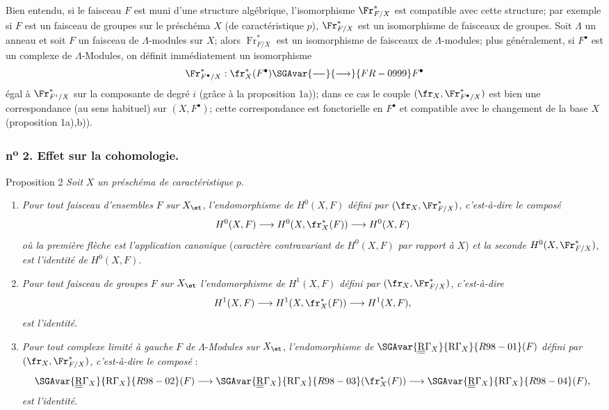 Bien entendu, si le faisceau $F$ est muni d'une structure algébrique, l'isomorphisme $\Fr^*_{F/X}$ est compatible avec cette structure; par exemple si $F$ est un faisceau de groupes sur le préschéma $X$ (de caractéristique $p$), $\Fr^*_{F/X}$ est un isomorphisme de faisceaux de groupes. Soit $\Lambda$ un anneau et soit $F$ un faisceau de $\Lambda$-modules sur $X$; alors $\operatorname{Fr}^*_{F/X}$ est un isomorphisme de faisceaux de $\Lambda$-modules; plus généralement, si $F^\bullet$ est un complexe de $\Lambda$-Modules, on définit immédiatement un isomorphisme
\[
\Fr^*_{F^\bullet/X}:\fr_X^*(F^\bullet)\SGAvar{\relbar\joinrel\relbar}{\longrightarrow}{FR-0999} F^\bullet
\]
égal à $\Fr^*_{F^i/X}$ sur la composante de degré $i$ (grâce à la proposition 1a)); dans ce cas le couple $(\fr_X,\Fr^*_{F^\bullet/X})$ est bien une correspondance (au sens habituel) sur $(X,F^\bullet)$; cette correspondance est fonctorielle en $F^\bullet$ et compatible avec le changement de la base $X$ (proposition 1a),b)).

\subsubsection*{n\textsuperscript{o} 2. Effet sur la cohomologie.}

\begin{statement}{Proposition 2}
\emph{Soit} $X$ \emph{un préschéma de caractéristique} $p$.
\begin{enumerate}[label=\alph*)]
\item \emph{Pour tout faisceau d'ensembles} $F$ \emph{sur} $X_{\et}$, \emph{l'endomorphisme de} $H^0(X,F)$ \emph{défini par} $(\fr_X,\Fr^*_{F/X})$, \emph{c'est-à-dire le composé}
\[
H^0(X,F)\longrightarrow H^0(X,\fr_X^*(F))\longrightarrow H^0(X,F)
\]
\emph{où la première flèche est l'application canonique} (\emph{caractère contravariant de} $H^0(X,F)$ \emph{par rapport à} $X$) \emph{et la seconde} $H^0(X,\Fr^*_{F/X})$, \emph{est l'identité de} $H^0(X,F)$.
\item
\emph{Pour tout faisceau de groupes} $F$ \emph{sur} $X_{\et}$ \emph{l'endomorphisme de} $H^1(X,F)$ \emph{défini par} $(\fr_X,\Fr^*_{F/X})$, \emph{c'est-à-dire}
\[
H^1(X,F)\longrightarrow H^1(X,\fr_X^*(F))\longrightarrow H^1(X,F),
\]
\emph{est l'identité}.
\item \emph{Pour tout complexe limité à gauche} $F$ \emph{de} $\Lambda$-\emph{Modules sur} $X_{\et}$, \emph{l'endomorphisme de} $\SGAvar{\underline{\underline{\mathrm{R}}}\Gamma_X}{\mathrm{R}\Gamma_X}{R98-01}(F)$ \emph{défini par} $(\fr_X,\Fr^*_{F/X})$, \emph{c'est-à-dire le composé} :
\[
\SGAvar{\underline{\underline{\mathrm{R}}}\Gamma_X}{\mathrm{R}\Gamma_X}{R98-02}(F)\longrightarrow \SGAvar{\underline{\underline{\mathrm{R}}}\Gamma_X}{\mathrm{R}\Gamma_X}{R98-03}(\fr_X^*(F))\longrightarrow \SGAvar{\underline{\underline{\mathrm{R}}}\Gamma_X}{\mathrm{R}\Gamma_X}{R98-04}(F),
\]
\emph{est l'identité}.
\end{enumerate}
\end{statement}

